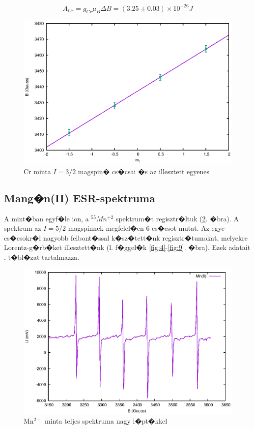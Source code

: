 \documentclass[a4paper,12pt]{article}
\begin{document}
\begin{equation}
A_{Cr}=g_{Cr}\mu_B\Delta B=(3.25\pm 0.03)\times10^{-26}J
\label{eq:10}
\end{equation}

\begin{figure}[H]
\includegraphics[width=15cm]{crhf.eps}
\centering
\caption{Cr minta $I=3/2$ magspin� cs�csai �s az illesztett egyenes}
\label{fig:crhf}
\end{figure}

\subsection{Mang�n(II) ESR-spektruma}

A mint�ban egyf�le ion, a  $^{55}Mn^{+2}$ spektrum�t regisztr�ltuk (\ref{fig:2}. �bra). A spektrum az $I=5/2$ magspinnek megfelel�en 6 cs�csot mutat. Az egye cs�csokr�l nagyobb felbont�ssal k�sz�tett�nk regisztr�tumokat, melyekre Lorentz-g�rb�ket illesztett�nk (l. f�ggel�k \ref{fig:4}-\ref{fig:9}. �bra). Ezek adatait . t�bl�zat tartalmazza.

\begin{figure}[H]
\includegraphics[width=15cm]{Mn_teljes.eps}
\centering
\caption{Mn$^{2+}$ minta teljes spektruma nagy l�pt�kkel}
\label{fig:2}
\end{figure}
\end{document}
